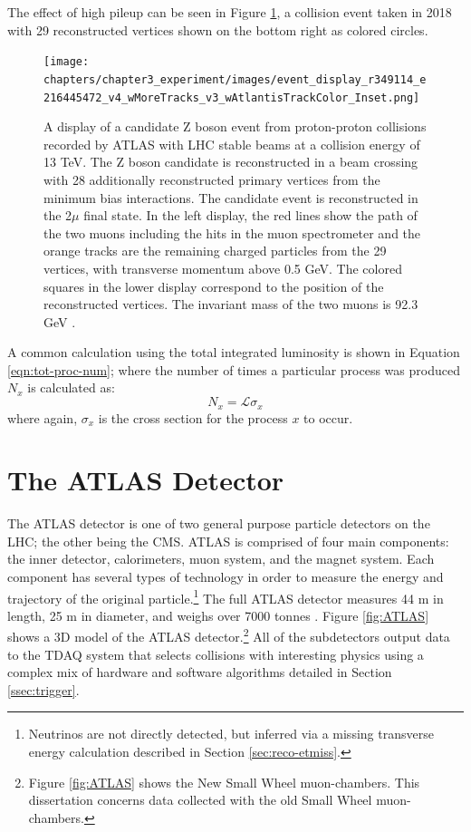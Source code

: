 		The effect of high pileup can be seen in Figure \ref{fig:high-pileup-event-display}, a collision event taken in 2018 with 29 reconstructed vertices shown on the bottom right as colored circles.
		\begin{figure}[!ht]
		\centering
		\texttt{[image: chapters/chapter3\_experiment/images/event\_display\_r349114\_e216445472\_v4\_wMoreTracks\_v3\_wAtlantisTrackColor\_Inset.png]}
		\caption{ A display of a candidate Z boson event from proton-proton collisions recorded by \gls{ATLAS} with \gls{LHC} stable beams at a collision energy of 13 TeV. The Z boson candidate is reconstructed in a beam crossing with 28 additionally reconstructed primary vertices from the minimum bias interactions. The candidate event is reconstructed in the 2$\mu$ final state. In the left display, the red lines show the path of the two muons including the hits in the muon spectrometer and the orange tracks are the remaining charged particles from the 29 vertices, with transverse momentum above 0.5 GeV. The colored squares in the lower display correspond to the position of the reconstructed vertices. The invariant mass of the two muons is 92.3 GeV \cite{eventdisplayrun2physics}. }
		\label{fig:high-pileup-event-display}
		\end{figure}


		A common calculation using the total integrated luminosity is shown in Equation \ref{eqn:tot-proc-num}; where the number of times a particular process was produced $N_{x}$ is calculated as:
		\begin{equation}\label{eqn:tot-proc-num}
		N_{x} = \mathcal{L} \sigma_{x}
		\end{equation}
		where again, $\sigma_{x}$ is the cross section for the process $x$ to occur.


\section{The \gls{ATLAS} Detector}\label{sec:ATLAS}
	The \acrfull{ATLAS} detector is one of two general purpose particle detectors on the \gls{LHC}; the other being the \acrfull{CMS}. \gls{ATLAS} is comprised of four main components: the inner detector, calorimeters, muon system, and the magnet system. Each component has several types of technology in order to measure the energy and trajectory of the original particle.\footnote{Neutrinos are not directly detected, but inferred via a missing transverse energy calculation described in Section \ref{sec:reco-etmiss}.} The full \gls{ATLAS} detector measures 44 m in length, 25 m in diameter, and weighs over 7000 tonnes \cite{ATLAS-JINST} . Figure \ref{fig:ATLAS} shows a 3D model of the \gls{ATLAS} detector.\footnote{Figure \ref{fig:ATLAS} shows the New Small Wheel muon-chambers. This dissertation concerns data collected with the old Small Wheel muon-chambers.} All of the subdetectors output data to the \gls{TDAQ} system that selects collisions with interesting physics using a complex mix of hardware and software algorithms detailed in Section \ref{ssec:trigger}. 

